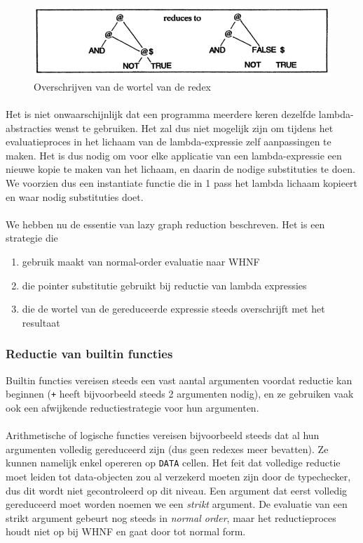 \documentclass[a4paper,10pt]{article}
\begin{document}
\begin{figure}[h]
  \caption{Overschrijven van de wortel van de redex}
  \includegraphics[width=\linewidth]{images/slpj209}
\end{figure}

\paragraph{}
Het is niet onwaarschijnlijk dat een programma meerdere keren dezelfde lambda-abstracties wenst te gebruiken.
Het zal dus niet mogelijk zijn om tijdens het evaluatieproces in het lichaam van de lambda-expressie zelf aanpassingen te maken.
Het is dus nodig om voor elke applicatie van een lambda-expressie een nieuwe kopie te maken van het lichaam, en daarin de nodige substituties te doen.
We voorzien dus een instantiate functie die in 1 pass het lambda lichaam kopieert en waar nodig substituties doet.
\paragraph{}
We hebben nu de essentie van lazy graph reduction beschreven. Het is een strategie die
\begin{enumerate}
\item gebruik maakt van normal-order evaluatie naar WHNF
\item die pointer substitutie gebruikt bij reductie van lambda expressies
\item die de wortel van de gereduceerde expressie steeds overschrijft met het resultaat
\end{enumerate}

\subsubsection{Reductie van builtin functies}
Builtin functies vereisen steeds een vast aantal argumenten voordat reductie kan beginnen (\texttt{+} heeft bijvoorbeeld steeds 2 argumenten nodig), en ze gebruiken vaak ook een afwijkende reductiestrategie voor hun argumenten.

\paragraph{}
Arithmetische of logische functies vereisen bijvoorbeeld steeds dat al hun argumenten volledig gereduceerd zijn (dus geen redexes meer bevatten).
Ze kunnen namelijk enkel opereren op \texttt{DATA} cellen.
Het feit dat volledige reductie moet leiden tot data-objecten zou al verzekerd moeten zijn door de typechecker, dus dit wordt niet gecontroleerd op dit niveau.
Een argument dat eerst volledig gereduceerd moet worden noemen we een \emph{strikt} argument.
De evaluatie van een strikt argument gebeurt nog steeds in \emph{normal order}, maar het reductieproces houdt niet op bij WHNF en gaat door tot normal form.
\end{document}
